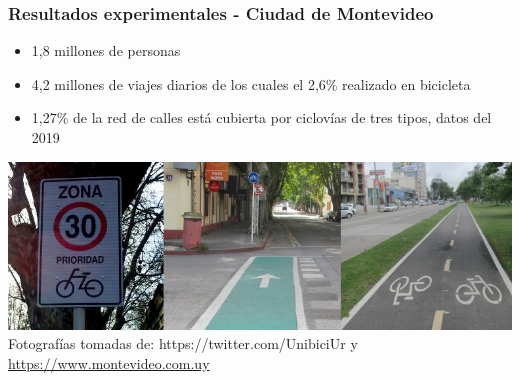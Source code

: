 \documentclass[aspectratio=43, 10pt]{beamer}
\begin{document}
\begin{frame}
    \frametitle{Resultados experimentales - Ciudad de Montevideo}

    \begin{itemize}
        \item{1,8 millones de personas}
        \item{4,2 millones de viajes diarios de los cuales el 2,6\% realizado en bicicleta \parencite{Mauttone2017a}}
        \item{1,27\% de la red de calles está cubierta por ciclovías de tres tipos, datos del 2019}
    \end{itemize}
    \includegraphics[width=\textwidth]{images/mdeo_tipos_ciclovias.png}
    \tiny{Fotografías tomadas de: {https://twitter.com/UnibiciUr} y \url{https://www.montevideo.com.uy}}
\end{frame}
\end{document}
